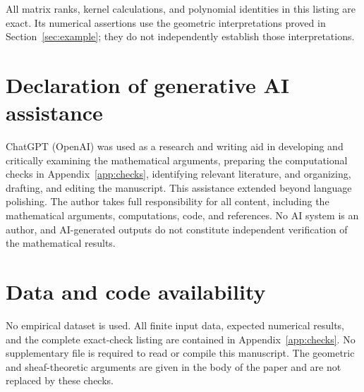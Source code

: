 \documentclass[11pt,reqno]{amsart}
\numberwithin{equation}{section}
\theoremstyle{definition}
\theoremstyle{remark}
\begin{document}
All matrix ranks, kernel calculations, and polynomial identities in
this listing are exact. Its numerical assertions use the geometric
interpretations proved in Section~\ref{sec:example}; they do not
independently establish those interpretations.

\section*{Declaration of generative AI assistance}
ChatGPT (OpenAI) was used as a research and writing aid in developing and
critically examining the mathematical arguments, preparing the computational
checks in Appendix~\ref{app:checks}, identifying relevant literature, and
organizing, drafting, and editing the manuscript. This assistance extended
beyond language polishing. The author takes full responsibility for all
content, including the mathematical arguments, computations, code, and
references. No AI system is an author, and AI-generated outputs do not
constitute independent verification of the mathematical results.

\section*{Data and code availability}
No empirical dataset is used. All finite input data, expected numerical
results, and the complete exact-check listing are contained in
Appendix~\ref{app:checks}. No supplementary file is required to read or
compile this manuscript. The geometric and sheaf-theoretic arguments
are given in the body of the paper and are not replaced by these checks.
\end{document}
